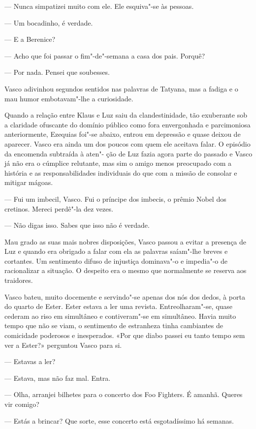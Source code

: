 --- Nunca simpatizei muito com ele. Ele esquiva"-se às pessoas.

--- Um bocadinho, é verdade.

--- E a Berenice?

--- Acho que foi passar o fim"-de"-semana a casa dos pais.
Porquê?

--- Por nada. Pensei que soubesses.


Vasco adivinhou segundos sentidos nas palavras de Tatyana, mas a
fadiga e o mau humor embotavam"-lhe a curiosidade.

Quando a relação entre
Klaus e Luz saiu da clandestinidade, tão exuberante sob a claridade
ofuscante do domínio público como fora envergonhada e parcimoniosa
anteriormente, Ezequias foi"-se abaixo, entrou em depressão e quase
deixou de aparecer. Vasco era ainda um dos poucos com quem ele aceitava
falar. O episódio da encomenda subtraída à aten"- ção de Luz fazia agora
parte do passado e Vasco já não era o cúmplice relutante, mas sim o
amigo menos preocupado com a história e as responsabilidades individuais
do que com a missão de consolar e mitigar mágoas.

--- Fui um imbecil, Vasco. Fui o príncipe dos imbecis, o prêmio Nobel dos
  cretinos. Mereci perdê"-la dez vezes.


--- Não digas isso. Sabes que isso não é verdade.


Mau grado as suas mais nobres disposições, Vasco passou a evitar a
presença de Luz e quando era obrigado a falar com ela as palavras
saíam"-lhe breves e cortantes. Um sentimento difuso de injustiça
dominava"-o e impedia"-o de racionalizar a situação. O despeito era o
mesmo que normalmente se reserva aos traidores.

Vasco bateu, muito docemente e servindo"-se apenas dos nós dos dedos, à
porta do quarto de Ester. Ester estava a ler uma revista.
Entreolharam"-se, quase cederam ao riso em simultâneo e contiveram"-se
em simultâneo. Havia muito tempo que não se viam, o sentimento de
estranheza tinha cambiantes de comicidade poderosos e inesperados. «Por
que diabo passei eu tanto tempo sem ver a Ester?» perguntou Vasco para
si.

--- Estavas a ler?

--- Estava, mas não faz mal. Entra.

--- Olha, arranjei bilhetes para o concerto dos Foo Fighters. É amanhã.
  Queres vir comigo?

--- Estás a brincar? Que sorte, esse concerto está esgotadíssimo há
  semanas.

